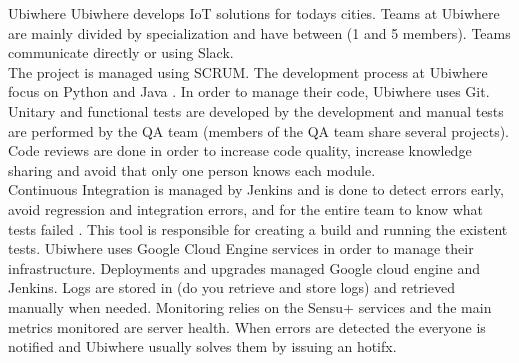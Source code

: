     \begin{companyreport}{Ubiwhere}
      \product
      Ubiwhere develops IoT solutions for todays cities.
      \teams
      Teams at Ubiwhere are mainly divided by specialization and have between (1 and 5 members). Teams communicate directly or using Slack. \\
      The project is managed using SCRUM.
      \development
      The development process at Ubiwhere focus on Python and Java . In order to manage their code, Ubiwhere uses Git. \\
      Unitary and functional tests are developed by the development and manual tests are performed by the QA team (members of the QA team share several projects).  \\
      Code reviews are done in order to increase code quality, increase knowledge sharing and avoid that only one person knows each module. \\
      Continuous Integration is managed by Jenkins and is done to detect errors early, avoid regression and integration errors, and for the entire team to know what tests failed . This tool is  responsible for creating a build and running the existent tests.
      \operations
      Ubiwhere uses Google Cloud Engine services in order to manage their infrastructure.
      Deployments and upgrades managed Google cloud engine and Jenkins.
      Logs are stored in (do you retrieve and store logs) and retrieved manually when needed.
      Monitoring relies on the Sensu+ services and the main metrics monitored are server health.
      When errors are detected the everyone is notified and  Ubiwhere usually solves them by issuing an hotifx.
      \reportend
    \end{companyreport}

